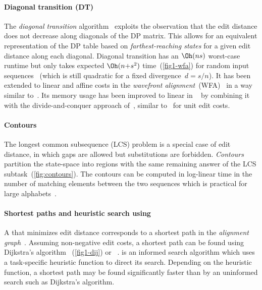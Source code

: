 \paragraph{Diagonal transition (DT)}
The \emph{diagonal transition}
algorithm~\citep{ukkonen1985algorithms,myers1986ano} exploits the observation
that the edit distance does not decrease along diagonals of the DP matrix. This
allows for an equivalent representation of the DP table based on
\emph{farthest-reaching states} for a given edit distance along each diagonal.
Diagonal transition has an $\Oh(ns)$ worst-case runtime but only takes expected
$\Oh(n{+}s^2)$ time~(\cref{fig1-wfa}) for random input
sequences~\citep{myers1986ano} (which is still quadratic for a fixed
divergence~$d=s/n$). It has been extended to linear and affine costs in the
\emph{wavefront alignment}~(WFA)~\citep{marco2021fast} in a way similar
to~\citet{gotoh1982improved}. Its memory usage has been improved to linear in
\wfa~\citep{marco2022optimal} by combining it with the divide-and-conquer
approach of~\citet{hirschberg1975linear}, similar to~\citet{myers1986ano} for
unit edit costs.

\paragraph{Contours}
The longest common subsequence (LCS) problem is a special case of edit distance,
in which gaps are allowed but substitutions are forbidden. \emph{Contours}
partition the state-space into regions with the same remaining answer of the LCS
subtask~(\cref{fig:contours}). The contours can be computed in log-linear
time in the number of matching elements between the two sequences which is
practical for large alphabets~\citep{hirschberg1977algorithms,hunt1977fast}.

\paragraph{Shortest paths and heuristic search using \A}
A \pa that minimizes edit distance corresponds to a shortest path in the
\emph{alignment graph}~\citep{vintsyuk1968speech,ukkonen1985algorithms}.
Assuming non-negative edit costs, a shortest path can be found using Dijkstra's
algorithm~\citep{ukkonen1985algorithms} (\cref{fig1-dij}) or
\A~\citep{hart1968formal,spouge1989speeding}. \A is an informed search algorithm which uses a
task-specific heuristic function to direct its search. Depending on the
heuristic function, a shortest path may be found significantly faster than by an
uninformed search such as Dijkstra's algorithm.


